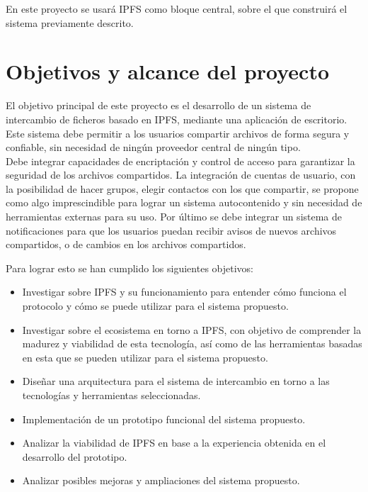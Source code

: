 En este proyecto se usará IPFS como bloque central, sobre el que construirá el sistema previamente descrito.


\section{Objetivos y alcance del proyecto}\label{sec:objetivos}
El objetivo principal de este proyecto es el desarrollo de un sistema de intercambio de ficheros basado en IPFS, mediante una aplicación de escritorio.
Este sistema debe permitir a los usuarios compartir archivos de forma segura y confiable, sin necesidad de ningún proveedor
central de ningún tipo.
\\Debe integrar capacidades  de encriptación y control de acceso para garantizar la seguridad de los
archivos compartidos. La integración de cuentas de usuario, con la posibilidad de hacer grupos, elegir contactos con los que
compartir, se propone como algo imprescindible para lograr un sistema autocontenido y sin necesidad de herramientas externas
para su uso. Por último se debe integrar un sistema de notificaciones para que los usuarios puedan recibir avisos de nuevos
archivos compartidos, o de cambios en los archivos compartidos.

Para lograr esto se han cumplido los siguientes objetivos:
\begin{itemize}

      \item Investigar sobre IPFS y su funcionamiento para entender cómo funciona el protocolo
            y cómo se puede utilizar para el sistema propuesto.
      \item Investigar sobre el ecosistema en torno a IPFS, con objetivo de comprender
            la madurez y viabilidad de esta tecnología, así como de las herramientas basadas en esta
            que se pueden utilizar para el sistema propuesto.
      \item Diseñar una arquitectura para el sistema de intercambio en torno a las tecnologías y herramientas seleccionadas.
      \item Implementación de un prototipo funcional del sistema propuesto.
      \item Analizar la viabilidad de IPFS en base a la experiencia obtenida en el desarrollo del prototipo.
      \item Analizar posibles mejoras y ampliaciones del sistema propuesto.

\end{itemize}

